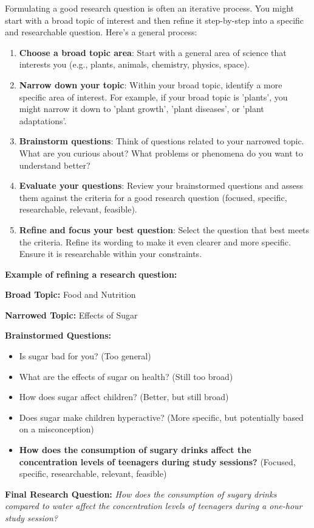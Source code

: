 Formulating a good research question is often an iterative process. You might start with a broad topic of interest and then refine it step-by-step into a specific and researchable question. Here's a general process:

\begin{enumerate}
    \item \textbf{Choose a broad topic area}: Start with a general area of science that interests you (e.g., plants, animals, chemistry, physics, space).
    \item \textbf{Narrow down your topic}:  Within your broad topic, identify a more specific area of interest.  For example, if your broad topic is 'plants', you might narrow it down to 'plant growth', 'plant diseases', or 'plant adaptations'.
    \item \textbf{Brainstorm questions}:  Think of questions related to your narrowed topic.  What are you curious about? What problems or phenomena do you want to understand better?
    \item \textbf{Evaluate your questions}:  Review your brainstormed questions and assess them against the criteria for a good research question (focused, specific, researchable, relevant, feasible).
    \item \textbf{Refine and focus your best question}:  Select the question that best meets the criteria.  Refine its wording to make it even clearer and more specific. Ensure it is researchable within your constraints.
\end{enumerate}

\begin{example}
\textbf{Example of refining a research question:}

\textbf{Broad Topic:}  Food and Nutrition

\textbf{Narrowed Topic:}  Effects of Sugar

\textbf{Brainstormed Questions:}
\begin{itemize}
    \item Is sugar bad for you? (Too general)
    \item What are the effects of sugar on health? (Still too broad)
    \item How does sugar affect children? (Better, but still broad)
    \item Does sugar make children hyperactive? (More specific, but potentially based on a misconception)
    \item \textbf{How does the consumption of sugary drinks affect the concentration levels of teenagers during study sessions?} (Focused, specific, researchable, relevant, feasible)
\end{itemize}

\textbf{Final Research Question:} \textit{How does the consumption of sugary drinks compared to water affect the concentration levels of teenagers during a one-hour study session?}
\end{example}

